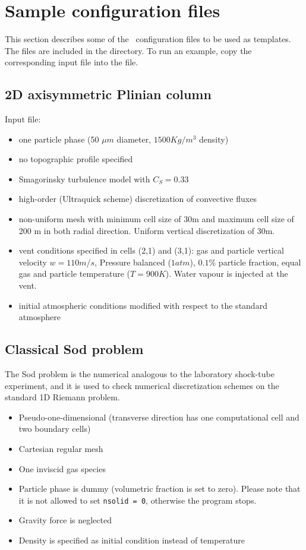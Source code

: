 \section{Sample configuration files}
\label{section:input_sample}
This section describes some of the \PDAC\ configuration files to be used
as templates. The files are included in the  directory.
To run an example, copy the corresponding input file into the 
 file.
\prettypar
\subsection{2D axisymmetric Plinian column}
Input file: 
\begin{itemize}
\item one particle phase (50 $\mu m$ diameter, $1500 Kg/m^3$ density)
\item no topographic profile specified
\item Smagorinsky turbulence model with $C_S=0.33$
\item high-order (Ultraquick scheme) discretization of convective fluxes
\item non-uniform mesh with minimum cell size of 30m and maximum cell size
      of 200 m in both radial direction. Uniform vertical discretization of
      30m.
\item vent conditions specified in cells (2,1) and (3,1): gas and particle
      vertical velocity $w = 110 m/s$, Pressure balanced ($1atm$), $0.1\%$
      particle fraction, equal gas and particle temperature ($T=900 K$).
      Water vapour is injected at the vent.
\item initial atmospheric conditions modified with respect to the standard 
      atmosphere
\end{itemize}

\newpage
\subsection{Classical Sod problem}
The Sod problem is the numerical analogous to the laboratory shock-tube 
experiment, and it is used to check numerical discretization schemes on 
the standard 1D Riemann problem.
\begin{itemize}
\item Pseudo-one-dimensional (transverse direction has one computational cell and two boundary cells)
\item Cartesian regular mesh
\item One inviscid gas species
\item Particle phase is dummy (volumetric fraction is set to zero). Please note that
      it is not allowed to set {\tt nsolid = 0}, otherwise the program stops.
\item Gravity force is neglected
\item Density is specified as initial condition instead of temperature
\end{itemize}

